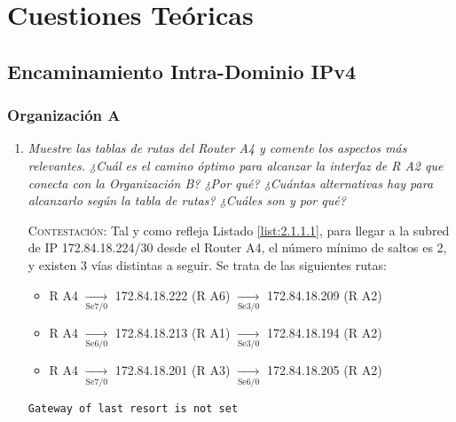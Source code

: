 \documentclass[twoside, 11pt]{article}
\begin{document}
\section{Cuestiones Teóricas}

\subsection{Encaminamiento Intra-Dominio IPv4}

\subsubsection{Organización A}

\begin{enumerate}
    \item \textit{Muestre las tablas de rutas del Router A4 y comente los aspectos más relevantes. ¿Cuál es el camino óptimo para alcanzar la interfaz de R A2 que conecta con
la Organización B? ¿Por qué? ¿Cuántas alternativas hay
para alcanzarlo según la tabla de rutas? ¿Cuáles son y por qué?}
    \label{ej:2.1.1.1}

\vspace{7px}

\textsc{Contestación}: Tal y como refleja Listado \ref{list:2.1.1.1}, para llegar a la subred de IP 172.84.18.224/30 desde el Router A4, el número mínimo de saltos es 2, y existen 3 vías distintas a seguir. Se trata de las siguientes rutas:

\begin{itemize}
    \item R A4 $\xrightarrow[\text{Se7/0}]{}$ 172.84.18.222 (R A6) $\xrightarrow[\text{Se3/0}]{}$ 172.84.18.209 (R A2)

    \item R A4 $\xrightarrow[\text{Se6/0}]{}$ 172.84.18.213 (R A1) $\xrightarrow[\text{Se3/0}]{}$ 172.84.18.194 (R A2)

    \item R A4 $\xrightarrow[\text{Se7/0}]{}$ 172.84.18.201 (R A3) $\xrightarrow[\text{Se6/0}]{}$ 172.84.18.205 (R A2)
\end{itemize}

\begin{center}
\begin{verbatim}
Gateway of last resort is not set


\end{verbatim}
\end{center}
\end{enumerate}
\end{document}
